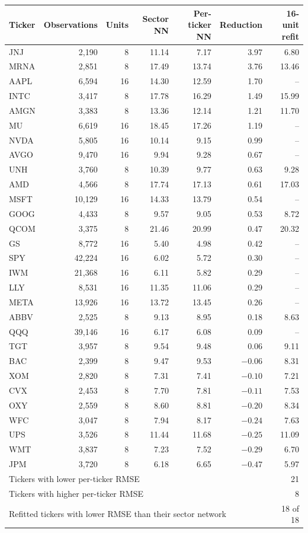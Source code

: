 \begin{tabular}{lrrrrrr}
\toprule
Ticker & Observations & Units & Sector NN & Per-ticker NN & Reduction & 16-unit refit \\
\midrule
JNJ & 2{,}190 & 8 & 11.14 & 7.17 & 3.97 & 6.80 \\
MRNA & 2{,}851 & 8 & 17.49 & 13.74 & 3.76 & 13.46 \\
AAPL & 6{,}594 & 16 & 14.30 & 12.59 & 1.70 & -- \\
INTC & 3{,}417 & 8 & 17.78 & 16.29 & 1.49 & 15.99 \\
AMGN & 3{,}383 & 8 & 13.36 & 12.14 & 1.21 & 11.70 \\
MU & 6{,}619 & 16 & 18.45 & 17.26 & 1.19 & -- \\
NVDA & 5{,}805 & 16 & 10.14 & 9.15 & 0.99 & -- \\
AVGO & 9{,}470 & 16 & 9.94 & 9.28 & 0.67 & -- \\
UNH & 3{,}760 & 8 & 10.39 & 9.77 & 0.63 & 9.28 \\
AMD & 4{,}566 & 8 & 17.74 & 17.13 & 0.61 & 17.03 \\
MSFT & 10{,}129 & 16 & 14.33 & 13.79 & 0.54 & -- \\
GOOG & 4{,}433 & 8 & 9.57 & 9.05 & 0.53 & 8.72 \\
QCOM & 3{,}375 & 8 & 21.46 & 20.99 & 0.47 & 20.32 \\
GS & 8{,}772 & 16 & 5.40 & 4.98 & 0.42 & -- \\
SPY & 42{,}224 & 16 & 6.02 & 5.72 & 0.30 & -- \\
IWM & 21{,}368 & 16 & 6.11 & 5.82 & 0.29 & -- \\
LLY & 8{,}531 & 16 & 11.35 & 11.06 & 0.29 & -- \\
META & 13{,}926 & 16 & 13.72 & 13.45 & 0.26 & -- \\
ABBV & 2{,}525 & 8 & 9.13 & 8.95 & 0.18 & 8.63 \\
QQQ & 39{,}146 & 16 & 6.17 & 6.08 & 0.09 & -- \\
TGT & 3{,}957 & 8 & 9.54 & 9.48 & 0.06 & 9.11 \\
BAC & 2{,}399 & 8 & 9.47 & 9.53 & $-0.06$ & 8.31 \\
XOM & 2{,}820 & 8 & 7.31 & 7.41 & $-0.10$ & 7.21 \\
CVX & 2{,}453 & 8 & 7.70 & 7.81 & $-0.11$ & 7.53 \\
OXY & 2{,}559 & 8 & 8.60 & 8.81 & $-0.20$ & 8.34 \\
WFC & 3{,}047 & 8 & 7.94 & 8.17 & $-0.24$ & 7.63 \\
UPS & 3{,}526 & 8 & 11.44 & 11.68 & $-0.25$ & 11.09 \\
WMT & 3{,}837 & 8 & 7.23 & 7.52 & $-0.29$ & 6.70 \\
JPM & 3{,}720 & 8 & 6.18 & 6.65 & $-0.47$ & 5.97 \\
\midrule
\multicolumn{6}{l}{Tickers with lower per-ticker RMSE} & 21 \\
\multicolumn{6}{l}{Tickers with higher per-ticker RMSE} & 8 \\
\multicolumn{6}{l}{Refitted tickers with lower RMSE than their sector network} & 18 of 18 \\
\bottomrule
\end{tabular}
